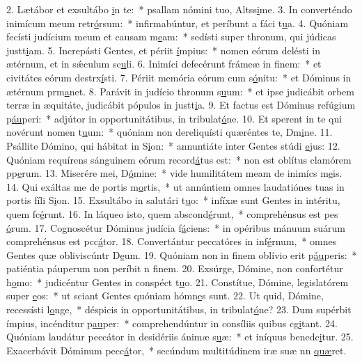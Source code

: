 2. Lætábor et exsultábo \uline{i}n te:~* psallam nómini tuo, Altss\uline{i}me.
3. In converténdo inimícum meum retr\uline{ó}rsum:~* infirmabúntur, et períbunt a fáci t\uline{u}a.
4. Quóniam fecísti judícium meum et causam m\uline{e}am:~* sedísti super thronum, qui júdicas justt\uline{i}am.
5. Increpásti Gentes, et périit \uline{í}mpius:~* nomen eórum delésti in ætérnum, et in sǽculum sc\uline{u}li.
6. Inimíci defecérunt frámeæ in f\uline{i}nem:~* et civitátes eórum destrx\uline{í}sti.
7. Périit memória eórum cum s\uline{ó}nitu:~* et Dóminus in ætérnum prm\uline{a}net.
8. Parávit in judício thronum s\uline{u}um:~* et ipse judicábit orbem terræ in æquitáte, judicábit pópulos in justt\uline{i}a.
9. Et factus est Dóminus refúgium p\uline{áu}peri:~* adjútor in opportunitátibus, in tribulat\uline{ó}ne.
10. Et sperent in te qui novérunt nomen t\uline{u}um:~* quóniam non dereliquísti quæréntes te, Dm\uline{i}ne.
11. Psállite Dómino, qui hábitat in S\uline{i}on:~* annuntiáte inter Gentes stúdi \uline{e}jus:
12. Quóniam requírens sánguinem eórum record\uline{á}tus est:~* non est oblítus clamórem pp\uline{e}rum.
13. Miserére mei, D\uline{ó}mine:~* vide humilitátem meam de inimícs m\uline{e}is.
14. Qui exáltas me de portis m\uline{o}rtis,~* ut annúntiem omnes laudatiónes tuas in portis fíli S\uline{i}on.
15. Exsultábo in salutári t\uline{u}o:~* infíxæ sunt Gentes in intéritu, quem fc\uline{é}runt.
16. In láqueo isto, quem abscond\uline{é}runt,~* comprehénsus est pes \uline{ó}rum.
17. Cognoscétur Dóminus judícia f\uline{á}ciens:~* in opéribus mánuum suárum comprehénsus est pcc\uline{á}tor.
18. Convertántur peccatóres in inf\uline{é}rnum,~* omnes Gentes quæ obliviscúntr D\uline{e}um.
19. Quóniam non in finem oblívio erit p\uline{áu}peris:~* patiéntia páuperum non períbit n f\uline{i}nem.
20. Exsúrge, Dómine, non confortétur h\uline{o}mo:~* judicéntur Gentes in conspéct t\uline{u}o.
21. Constítue, Dómine, legislatórem super \uline{e}os:~* ut sciant Gentes quóniam hómn\uline{e}s sunt.
22. Ut quid, Dómine, recessísti l\uline{o}nge,~* déspicis in opportunitátibus, in tribulat\uline{ó}ne?
23. Dum supérbit ímpius, incénditur p\uline{au}per:~* comprehendúntur in consíliis quibus cg\uline{i}tant.
24. Quóniam laudátur peccátor in desidériis ánimæ s\uline{u}æ:~* et iníquus benedc\uline{i}tur.
25. Exacerbávit Dóminum pecc\uline{á}tor,~* secúndum multitúdinem iræ suæ nn \uline{quæ}ret.
